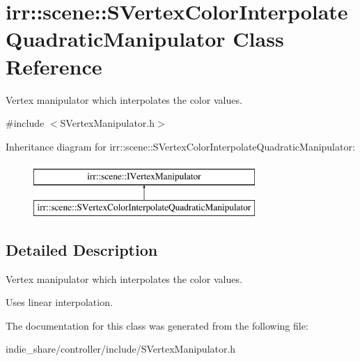 \hypertarget{classirr_1_1scene_1_1SVertexColorInterpolateQuadraticManipulator}{}\section{irr\+:\+:scene\+:\+:S\+Vertex\+Color\+Interpolate\+Quadratic\+Manipulator Class Reference}
\label{classirr_1_1scene_1_1SVertexColorInterpolateQuadraticManipulator}


Vertex manipulator which interpolates the color values.  




{\ttfamily \#include $<$S\+Vertex\+Manipulator.\+h$>$}

Inheritance diagram for irr\+:\+:scene\+:\+:S\+Vertex\+Color\+Interpolate\+Quadratic\+Manipulator\+:\begin{figure}[H]
\begin{center}
\leavevmode
\includegraphics[height=2.000000cm]{classirr_1_1scene_1_1SVertexColorInterpolateQuadraticManipulator}
\end{center}
\end{figure}


\subsection{Detailed Description}
Vertex manipulator which interpolates the color values. 

Uses linear interpolation. 

The documentation for this class was generated from the following file\+:\begin{DoxyCompactItemize}
\item 
indie\+\_\+share/controller/include/S\+Vertex\+Manipulator.\+h\end{DoxyCompactItemize}
